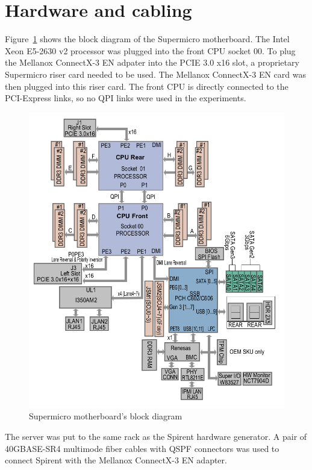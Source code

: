 
\section{Hardware and cabling}\label{sec:setup-hardware}
Figure~\ref{fig:setup-supermicro-board} shows the block diagram of the Supermicro motherboard.
The Intel Xeon E5-2630 v2 processor was plugged into the front CPU socket 00.
To plug the Mellanox ConnectX-3 EN adpater into the PCIE 3.0 x16 slot,
a proprietary Supermicro riser card needed to be used.
The Mellanox ConnectX-3 EN card was then plugged into this riser card.
The front CPU is directly connected to the PCI-Express links, so no QPI links were used in the experiments.
\begin{figure}
	\centering
	\includegraphics[width=14.5cm,keepaspectratio]{fig/supermicro-board.png}
	\caption{Supermicro motherboard's block diagram}
	\label{fig:setup-supermicro-board}
\end{figure}

The server was put to the same rack as the Spirent hardware generator.
A pair of 40GBASE-SR4 multimode fiber cables with QSPF connectors
was used to connect Spirent with the Mellanox ConnectX-3 EN adapter.
